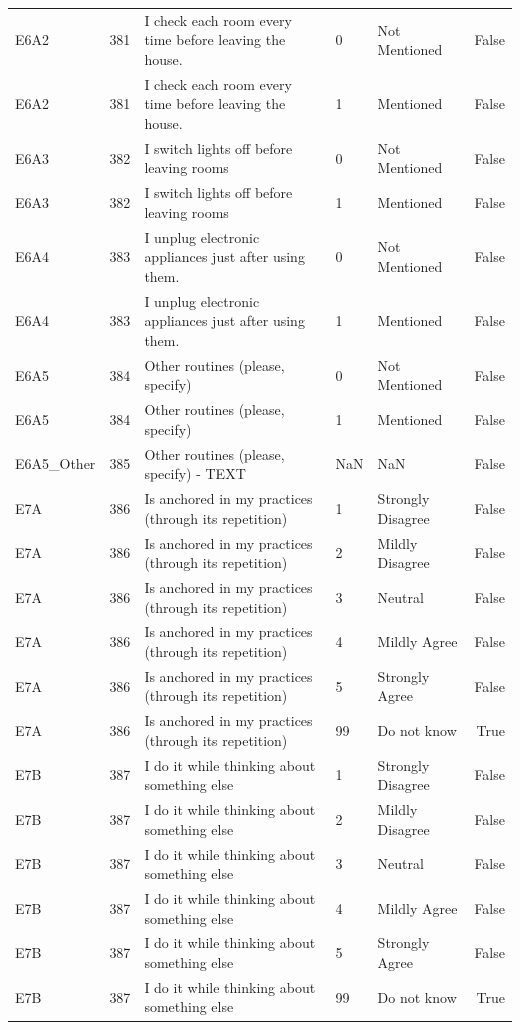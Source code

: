 \begin{tabular}{lrlllr}
E6A2 & 381 &  I check each room every time before leaving the house. & 0 & Not Mentioned & False \\
E6A2 & 381 &  I check each room every time before leaving the house. & 1 & Mentioned & False \\
E6A3 & 382 & I switch lights off before leaving rooms & 0 & Not Mentioned & False \\
E6A3 & 382 & I switch lights off before leaving rooms & 1 & Mentioned & False \\
E6A4 & 383 & I unplug electronic appliances just after using them. & 0 & Not Mentioned & False \\
E6A4 & 383 & I unplug electronic appliances just after using them. & 1 & Mentioned & False \\
E6A5 & 384 & Other routines (please, specify) & 0 & Not Mentioned & False \\
E6A5 & 384 & Other routines (please, specify) & 1 & Mentioned & False \\
E6A5_Other & 385 & Other routines (please, specify) - TEXT & NaN & NaN & False \\
E7A & 386 & Is anchored in my practices (through its repetition) & 1 & Strongly Disagree & False \\
E7A & 386 & Is anchored in my practices (through its repetition) & 2 & Mildly Disagree & False \\
E7A & 386 & Is anchored in my practices (through its repetition) & 3 & Neutral & False \\
E7A & 386 & Is anchored in my practices (through its repetition) & 4 & Mildly Agree & False \\
E7A & 386 & Is anchored in my practices (through its repetition) & 5 & Strongly Agree & False \\
E7A & 386 & Is anchored in my practices (through its repetition) & 99 & Do not know & True \\
E7B & 387 & I do it while thinking about something else & 1 & Strongly Disagree & False \\
E7B & 387 & I do it while thinking about something else & 2 & Mildly Disagree & False \\
E7B & 387 & I do it while thinking about something else & 3 & Neutral & False \\
E7B & 387 & I do it while thinking about something else & 4 & Mildly Agree & False \\
E7B & 387 & I do it while thinking about something else & 5 & Strongly Agree & False \\
E7B & 387 & I do it while thinking about something else & 99 & Do not know & True \\

\end{tabular}
